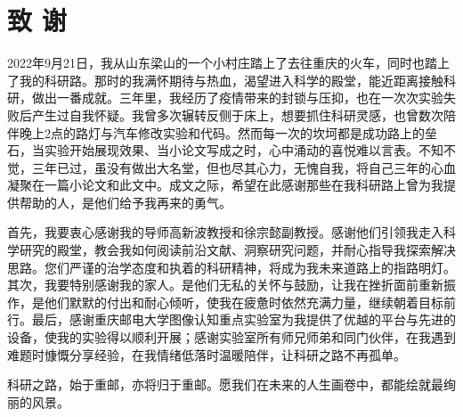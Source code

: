 \chapter{致 \quad 谢}
\thispagestyle{others}
\pagestyle{others}
\xiaosi
2022年9月21日，我从山东梁山的一个小村庄踏上了去往重庆的火车，同时也踏上了我的科研路。那时的我满怀期待与热血，渴望进入科学的殿堂，能近距离接触科研，做出一番成就。三年里，我经历了疫情带来的封锁与压抑，也在一次次实验失败后产生过自我怀疑。我曾多次辗转反侧于床上，想要抓住科研灵感，也曾数次陪伴晚上2点的路灯与汽车修改实验和代码。然而每一次的坎坷都是成功路上的垒石，当实验开始展现效果、当小论文写成之时，心中涌动的喜悦难以言表。不知不觉，三年已过，虽没有做出大名堂，但也尽其心力，无愧自我，将自己三年的心血凝聚在一篇小论文和此文中。成文之际，希望在此感谢那些在我科研路上曾为我提供帮助的人，是他们给予我再来的勇气。

首先，我要衷心感谢我的导师高新波教授和徐宗懿副教授。感谢他们引领我走入科学研究的殿堂，教会我如何阅读前沿文献、洞察研究问题，并耐心指导我探索解决思路。您们严谨的治学态度和执着的科研精神，将成为我未来道路上的指路明灯。其次，我要特别感谢我的家人。是他们无私的关怀与鼓励，让我在挫折面前重新振作，是他们默默的付出和耐心倾听，使我在疲惫时依然充满力量，继续朝着目标前行。最后，感谢重庆邮电大学图像认知重点实验室为我提供了优越的平台与先进的设备，使我的实验得以顺利开展；感谢实验室所有师兄师弟和同门伙伴，在我遇到难题时慷慨分享经验，在我情绪低落时温暖陪伴，让科研之路不再孤单。

科研之路，始于重邮，亦将归于重邮。愿我们在未来的人生画卷中，都能绘就最绚丽的风景。

